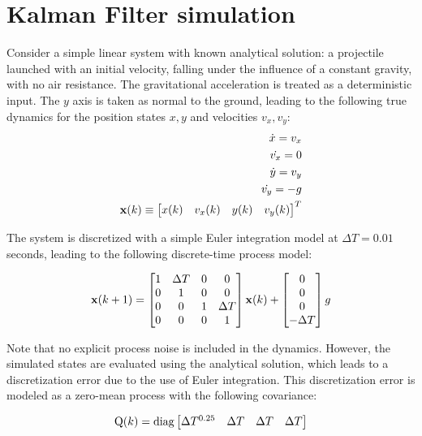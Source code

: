 \section{Kalman Filter simulation}

Consider a simple linear system with known analytical solution: a projectile launched with an initial velocity, falling under the influence of a constant gravity, with no air resistance.
The gravitational acceleration is treated as a deterministic input.
The $y$ axis is taken as normal to the ground, leading to the following true dynamics for the position states $x,y$ and velocities $v_x,v_y$:
\begin{align}
\dot{x} = v_x \\
\dot{v_x} = 0 \\
\dot{y} = v_y \\
\dot{v_y} = -g \\
\mathrm{\mathbf{x}}(k) \equiv \begin{bmatrix} x(k) & v_x(k) & y(k) & v_y(k) \end{bmatrix}^T
\end{align}

The system is discretized with a simple Euler integration model at $\Delta T = 0.01$ seconds, leading to the following discrete-time process model:

\begin{equation}
\mathrm{\mathbf{x}}(k+1) = \begin{bmatrix}
1 & \Delta T & 0 & 0\\
0 & 1 & 0 & 0\\
0 & 0 & 1 & \Delta T\\
0 & 0 & 0 & 1
\end{bmatrix}\mathrm{\mathbf{x}}(k) + 
\begin{bmatrix}
0 \\ 0 \\ 0 \\ -\Delta T
\end{bmatrix} g
\end{equation}

Note that no explicit process noise is included in the dynamics.
However, the simulated states are evaluated using the analytical solution, which leads to a discretization error due to the use of Euler integration.
This discretization error is modeled as a zero-mean process with the following covariance:

\begin{equation}
\mathrm{Q}(k) = \mathrm{diag}\begin{bmatrix} \Delta T^{0.25} & \Delta T & \Delta T & \Delta T \end{bmatrix}
\end{equation}

